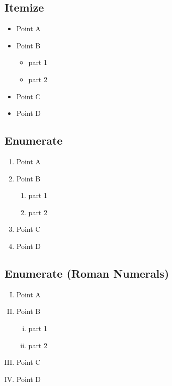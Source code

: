 \subsection{Itemize}
\begin{itemize}
    \item Point A
    \item Point B
    \begin{itemize}
        \item part 1
        \item part 2
    \end{itemize}
    \item Point C
    \item Point D
\end{itemize}

\subsection{Enumerate}
\begin{enumerate}
    \item Point A
    \item Point B
    \begin{enumerate}
        \item part 1
        \item part 2
    \end{enumerate}
    \item Point C
    \item Point D
\end{enumerate}

\subsection{Enumerate (Roman Numerals)}
\begin{enumerate} [(I)]
	\item Point A
	\item Point B
	\begin{enumerate} [(i)]
        \item part 1
        \item part 2
	\end{enumerate}
	\item Point C
	\item Point D
\end{enumerate}